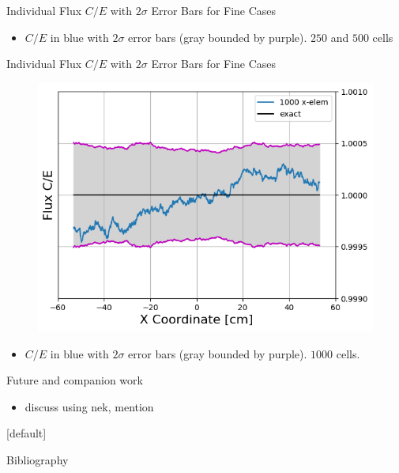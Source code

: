 \documentclass[9pt,t]{beamer}
\makeatletter
\newenvironment{withoutheadline}{
       \setbeamertemplate{headline}[default]
       \def\beamer@entrycode{\vspace*{-\headheight}}
    }{}
\makeatother
\begin{document}
\begin{frame}{Individual Flux $C/E$ with $2\sigma$ Error Bars for Fine Cases}
\begin{figure}[T]
\begin{subfigure}{0.495\textwidth}
        \end{subfigure}
    \end{figure}
    \begin{itemize}
        \item $C/E$ in blue with $2\sigma$ error bars (gray bounded by purple). $250$ and $500$ cells
    \end{itemize}
\end{frame}

\begin{frame}{Individual Flux $C/E$ with $2\sigma$ Error Bars for Fine Cases}
    \begin{figure}[T]
        \centering
        \includegraphics[width=0.8\linewidth]{figures/1000_flux_CE_error_bars}
    \end{figure}
    \begin{itemize}
        \item $C/E$ in blue with $2\sigma$ error bars (gray bounded by purple). $1000$ cells.
    \end{itemize}
\end{frame}


\begin{frame}{Future and companion work}
    \begin{itemize}
        \item discuss using nek, mention \cite{aya2023}
    \end{itemize}
\end{frame}


\begin{withoutheadline}
\begin{frame}[allowframebreaks]{Bibliography}
    \printbibliography
\end{frame}
\end{withoutheadline}
\end{document}
